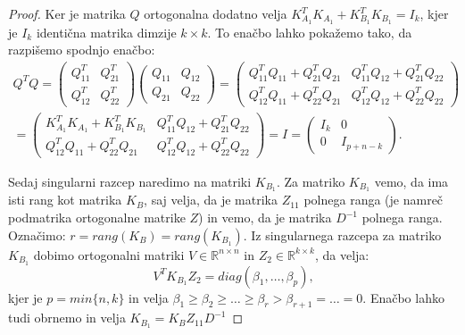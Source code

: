 \documentclass[mat1]{article}
\begin{document}
\begin{proof}
Ker je matrika $Q$ ortogonalna dodatno velja $K_{A_1}^TK_{A_1} + K_{B_1}^TK_{B_1} = I_k$, kjer je $I_k$ identična matrika dimzije $k \times k$. To enačbo lahko pokažemo tako, da razpišemo spodnjo enačbo:
\begin{gather*}
Q^T Q = 
\begin{pmatrix}
Q_{11}^T & Q_{21}^T \\ 
Q_{12}^T & Q_{22}^T
\end{pmatrix}
\begin{pmatrix}
Q_{11} & Q_{12} \\ 
Q_{21} & Q_{22}
\end{pmatrix} =
\begin{pmatrix}
Q_{11}^T Q_{11} + Q_{21}^T Q_{21} & Q_{11}^T Q_{12} + Q_{21}^T Q_{22} \\ 
Q_{12}^T Q_{11} + Q_{22}^T Q_{21} & Q_{12}^T Q_{12} + Q_{22}^T Q_{22}
\end{pmatrix} \\ =
\begin{pmatrix}
K_{A_1}^TK_{A_1} + K_{B_1}^TK_{B_1} & Q_{11}^T Q_{12} + Q_{21}^T Q_{22} \\ 
Q_{12}^T Q_{11} + Q_{22}^T Q_{21} & Q_{12}^T Q_{12} + Q_{22}^T Q_{22}
\end{pmatrix}  = I =
\begin{pmatrix}
I_k & 0\\ 
0 & I_{p+n-k}
\end{pmatrix} \text{.}
\end{gather*}

Sedaj singularni razcep naredimo na matriki $K_{B_1}$. Za matriko $K_{B_1}$ vemo, da ima isti rang kot matrika $K_B$, saj velja, da je matrika $Z_{11}$ polnega ranga (je namreč podmatrika ortogonalne matrike $Z$) in vemo, da je matrika $D^{-1}$ polnega ranga. Označimo: $r = rang(K_B) = rang(K_{B_1})$. Iz singularnega razcepa za matriko $K_{B_1}$ dobimo ortogonalni matriki $V \in \mathbb{R}^{ n \times n}$ in $Z_2 \in \mathbb{R}^{ k \times k}$, da velja:
\begin{equation}
V^T K_{B_1} Z_2 = diag(\beta_1, \ldots, \beta_p) \text{,} 
\end{equation} kjer je $p = min\{n, k\}$ in velja 
$ \beta_1 \geq \beta_2 \geq \ldots \geq \beta_r > \beta_{r+1} = \ldots = 0 $. Enačbo lahko tudi obrnemo in velja $K_{B_1} = K_B Z_{11} D^{-1}$


\end{proof}
\end{document}
